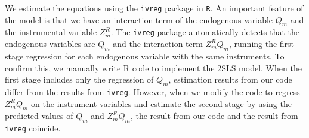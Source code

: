 \documentclass[11pt, a4paper]{article}
\begin{document}
We estimate the equations using the \texttt{ivreg} package in \texttt{R}.
An important feature of the model is that we have an interaction term of the endogenous variable $Q_{m}$ and the instrumental variable $Z^{R}_{m}$.
The \texttt{ivreg} package automatically detects that the endogenous variables are $Q_{m}$ and the interaction term $Z^{R}_{m}Q_{m}$, running the first stage regression for each endogenous variable with the same instruments. To confirm this, we manually write R code to implement the 2SLS model. 
When the first stage includes only the regression of $Q_{m}$, estimation results from our code differ from the results from \texttt{ivreg}. 
However, when we modify the code to regress $Z^{R}_{m}Q_{m}$ on the instrument variables and estimate the second stage by using the predicted values of $Q_{m}$ and $Z^{R}_{m}Q_{m}$, the result from our code and the result from \texttt{ivreg} coincide.
\end{document}
